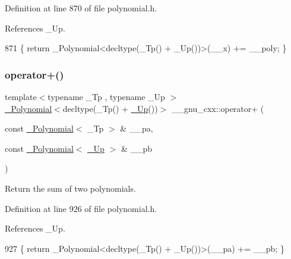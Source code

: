 Definition at line 870 of file polynomial.\+h.



References \+\_\+\+Up.


\begin{DoxyCode}
871     \{ \textcolor{keywordflow}{return} \_Polynomial<decltype(\_Tp() + \_Up())>(\_\_x) += \_\_poly; \}
\end{DoxyCode}
\mbox{\label{namespace____gnu__cxx_ada8a28005b5f71563bec55c71e03029b}} 
\subsubsection{\texorpdfstring{operator+()}{operator+()}\hspace{0.1cm}{\footnotesize\ttfamily [6/6]}}
{\footnotesize\ttfamily template$<$typename \+\_\+\+Tp , typename \+\_\+\+Up $>$ \\
\hyperlink{class____gnu__cxx_1_1__Polynomial}{\+\_\+\+Polynomial}$<$decltype(\+\_\+\+Tp() + \hyperlink{namespace____gnu__cxx_ab693ea357b6429b331e0bf09f9442385}{\+\_\+\+Up}())$>$ \+\_\+\+\_\+gnu\+\_\+cxx\+::operator+ (\begin{DoxyParamCaption}\item[{const \hyperlink{class____gnu__cxx_1_1__Polynomial}{\+\_\+\+Polynomial}$<$ \+\_\+\+Tp $>$ \&}]{\+\_\+\+\_\+pa,  }\item[{const \hyperlink{class____gnu__cxx_1_1__Polynomial}{\+\_\+\+Polynomial}$<$ \hyperlink{namespace____gnu__cxx_ab693ea357b6429b331e0bf09f9442385}{\+\_\+\+Up} $>$ \&}]{\+\_\+\+\_\+pb }\end{DoxyParamCaption})\hspace{0.3cm}{\ttfamily [inline]}}

Return the sum of two polynomials. 

Definition at line 926 of file polynomial.\+h.



References \+\_\+\+Up.


\begin{DoxyCode}
927     \{ \textcolor{keywordflow}{return} \_Polynomial<decltype(\_Tp() + \_Up())>(\_\_pa) += \_\_pb; \}
\end{DoxyCode}
\mbox{\label{namespace____gnu__cxx_a9f3b5d6e3db0c359eb0c8c067fc9ae05}} 
